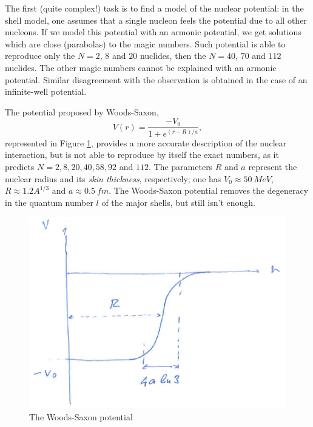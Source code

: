 The first (quite complex!) task is to find a model of the nuclear potential: in the shell model, one assumes that a single nucleon feels the potential due to all other nucleons. If we model this potential with an armonic potential, we get solutions which are close (parabolas) to the magic numbers. Such potential is able to reproduce only the \(N=2\), \(8\) and \(20\) nuclides, then the \(N=40\), \(70\) and \(112\) nuclides. The other magic numbers cannot be explained with an armonic potential. Similar disagreement with the observation is obtained in the case of an infinite-well potential.

The potential proposed by Woods-Saxon, 
\begin{equation*}
    V(r) = \frac{-V_0}{1+e^{(r-R)/a}},
\end{equation*}
represented in Figure \ref{nuclear-physics-fig:12}, provides a more accurate description of the nuclear interaction, but is not able to reproduce by itself the exact numbers, as it predicts \(N=2, 8, 20, 40, 58, 92\) and \(112\). The parameters \(R\) and \(a\) represent the nuclear radius and its \emph{skin thickness}, respectively; one has \(V_0\approx\SI{50}{MeV}\), \(R\approx 1.2A^{1/3}\) and \(a\approx\SI{0.5}{fm}\). The Woods-Saxon potential removes the degeneracy in the quantum number \(l\) of the major shells, but still isn't enough.
\begin{figure}[h]
    \centering
    \includegraphics[scale=0.45]{Figures/nuclear-physics-fig12}
    \caption{The Woods-Saxon potential}
    \label{nuclear-physics-fig:12}
\end{figure}

